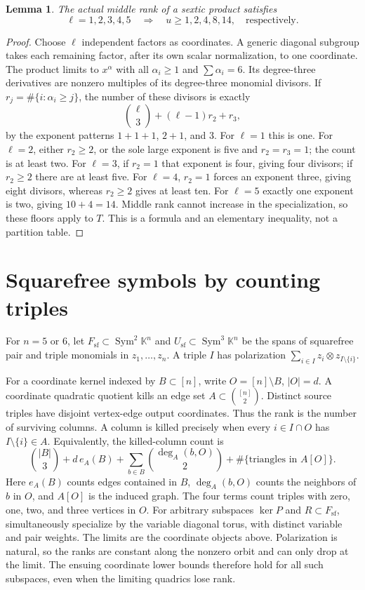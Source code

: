 \documentclass[11pt]{amsart}
\newtheorem{lemma}[theorem]{Lemma}
\theoremstyle{remark}\newtheorem{remark}[theorem]{Remark}
\numberwithin{equation}{section}
\newcommand{\K}{\mathbb K}
\newcommand{\Sym}{\operatorname{Sym}}
\newcommand{\sfq}{F_{\mathrm{sf}}}
\newcommand{\sfc}{U_{\mathrm{sf}}}
\begin{document}
\begin{lemma}\label{lem:floor}
The actual middle rank of a sextic product satisfies
\[
 \ell=1,2,3,4,5\quad\Longrightarrow\quad u\ge1,2,4,8,14,
 \quad\text{respectively}.
\]
\end{lemma}
\begin{proof}
Choose $\ell$ independent factors as coordinates. A generic diagonal
subgroup takes each remaining factor, after its own scalar normalization,
to one coordinate. The product limits to $x^\alpha$ with all
$\alpha_i\ge1$ and $\sum\alpha_i=6$. Its degree-three derivatives are
nonzero multiples of its degree-three monomial divisors. If
$r_j=\#\{i:\alpha_i\ge j\}$, the number of these divisors is exactly
\begin{equation}\label{eq:divisors}
 \binom\ell3+(\ell-1)r_2+r_3,
\end{equation}
by the exponent patterns $1+1+1$, $2+1$, and $3$.
For $\ell=1$ this is one. For $\ell=2$, either $r_2\ge2$, or the sole
large exponent is five and $r_2=r_3=1$; the count is at least two.
For $\ell=3$, if $r_2=1$ that exponent is four, giving four divisors;
if $r_2\ge2$ there are at least five. For $\ell=4$, $r_2=1$ forces
an exponent three, giving eight divisors, whereas $r_2\ge2$ gives at least
ten. For $\ell=5$ exactly one exponent is two, giving $10+4=14$.
Middle rank cannot increase in the specialization, so these floors apply
to $T$. This is a formula and an elementary inequality, not a partition table.
\end{proof}

\section{Squarefree symbols by counting triples}
For $n=5$ or $6$, let $\sfq\subset\Sym^2\K^n$ and
$\sfc\subset\Sym^3\K^n$ be the spans of squarefree pair and triple
monomials in $z_1,\ldots,z_n$. A triple $I$ has polarization
$\sum_{i\in I}z_i\otimes z_{I\setminus\{i\}}$.

For a coordinate kernel indexed by $B\subset[n]$, write
$O=[n]\setminus B$, $|O|=d$. A coordinate quadratic quotient kills
an edge set $A\subset\binom{[n]}2$. Distinct source triples have disjoint
vertex-edge output coordinates. Thus the rank is the number of surviving
columns. A column is killed precisely when every $i\in I\cap O$
has $I\setminus\{i\}\in A$. Equivalently, the killed-column count is
\begin{equation}\label{eq:killed}
 \binom{|B|}{3}+d\,e_A(B)
       +\sum_{b\in B}\binom{\deg_A(b,O)}2
       +\#\{\text{triangles in }A[O]\}.
\end{equation}
Here $e_A(B)$ counts edges contained in $B$, $\deg_A(b,O)$ counts the
neighbors of $b$ in $O$, and $A[O]$ is the induced graph.
The four terms count triples with zero, one, two, and three vertices in $O$.
For arbitrary subspaces $\ker P$ and $R\subset\sfq$, simultaneously
specialize by the variable diagonal torus, with distinct variable and pair
weights. The limits are the coordinate objects above. Polarization is
natural, so the ranks are constant along the nonzero orbit and can only
drop at the limit. The ensuing coordinate lower bounds therefore hold
for all such subspaces, even when the limiting quadrics lose rank.
\end{document}
